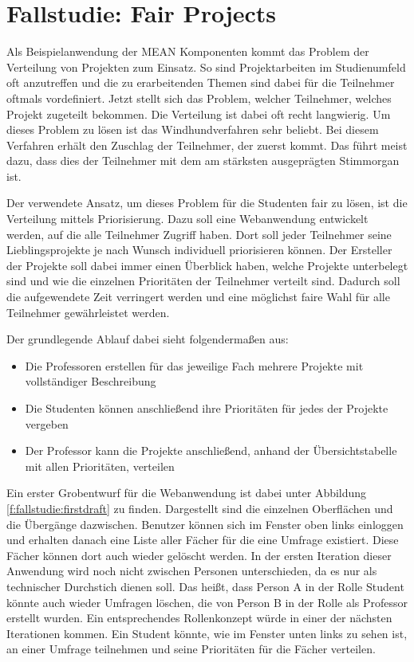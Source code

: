 \section{Fallstudie: Fair Projects}
\label{fallstudie-fair-projects}

Als Beispielanwendung der MEAN Komponenten kommt das Problem der Verteilung von Projekten zum Einsatz.
So sind Projektarbeiten im Studienumfeld oft anzutreffen und die zu erarbeitenden Themen sind dabei für die Teilnehmer oftmals vordefiniert.
Jetzt stellt sich das Problem, welcher Teilnehmer, welches Projekt zugeteilt bekommen.
Die Verteilung ist dabei oft recht langwierig.
Um dieses Problem zu lösen ist das Windhundverfahren sehr beliebt.
Bei diesem Verfahren erhält den Zuschlag der Teilnehmer, der zuerst kommt.
Das führt meist dazu, dass dies der Teilnehmer mit dem am stärksten ausgeprägten Stimmorgan ist. 

Der verwendete Ansatz, um dieses Problem für die Studenten fair zu lösen, ist die Verteilung mittels Priorisierung.
Dazu soll eine Webanwendung entwickelt werden, auf die alle Teilnehmer Zugriff haben. 
Dort soll jeder Teilnehmer seine Lieblingsprojekte je nach Wunsch individuell priorisieren können.
Der Ersteller der Projekte soll dabei immer einen Überblick haben, welche Projekte unterbelegt sind und wie die einzelnen Prioritäten der Teilnehmer verteilt sind.
Dadurch soll die aufgewendete Zeit verringert werden und eine möglichst faire Wahl für alle Teilnehmer gewährleistet werden.

Der grundlegende Ablauf dabei sieht folgendermaßen aus:
\begin{itemize}
	\item Die Professoren erstellen für das jeweilige Fach mehrere Projekte mit vollständiger Beschreibung
	\item Die Studenten können anschließend ihre Prioritäten für jedes der Projekte vergeben
	\item Der Professor kann die Projekte anschließend, anhand der Übersichtstabelle mit allen Prioritäten, verteilen
\end{itemize}

Ein erster Grobentwurf für die Webanwendung ist dabei unter Abbildung \ref{f:fallstudie:firstdraft} zu finden.
Dargestellt sind die einzelnen Oberflächen und die Übergänge dazwischen.
Benutzer können sich im Fenster oben links einloggen und erhalten danach eine Liste aller Fächer für die eine Umfrage existiert. Diese Fächer können dort auch wieder gelöscht werden.
In der ersten Iteration dieser Anwendung wird noch nicht zwischen Personen unterschieden, da es nur als technischer Durchstich dienen soll.
Das heißt, dass Person A in der Rolle Student könnte auch wieder Umfragen löschen, die von Person B in der Rolle als Professor erstellt wurden.
Ein entsprechendes Rollenkonzept würde in einer der nächsten Iterationen kommen.
Ein Student könnte, wie im Fenster unten links zu sehen ist, an einer Umfrage teilnehmen und seine Prioritäten für die Fächer verteilen.

